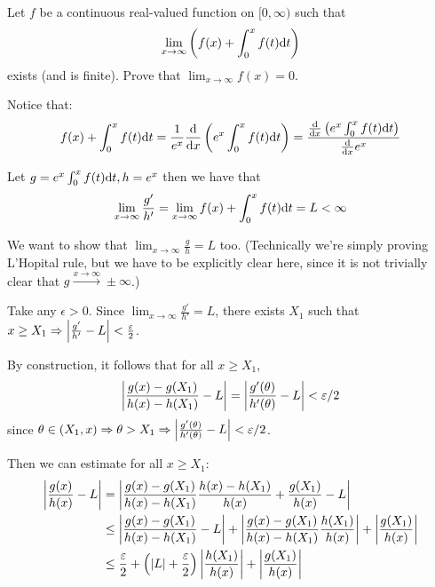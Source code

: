 \documentclass[a4paper, 12pt]{article}
\begin{document}
\begin{problem} 
Let $f$ be a continuous real-valued function on $[0, \infty)$ such that \begin{equation*}
\lim_{x \to \infty} \left(f(x) + \int_{0}^{x} f(t) \dt \right)
\end{equation*}
exists (and is finite). Prove that $\lim_{x \to \infty} f(x) = 0$.
\end{problem}
\begin{solution}
    Notice that:
    \begin{equation*}
    f(x) + \int_{0}^{x} f(t) \dt = \frac{1}{e^x} \ddx  \left(e^x \int_{0}^{x} f(t) \dt \right) = \frac{\ddx  \left(e^x \int_{0}^{x} f(t) \dt \right)}{\ddx e^x}
   \end{equation*}

   Let $g = e^x \int_{0}^{x} f(t) \dt, h = e^x$ then we have that \begin{equation*}
   \lim_{x \to \infty} \frac{g'}{h'} = \lim_{x \to \infty}  f(x) + \int_{0}^{x} f(t) \dt = L < \infty
   \end{equation*}

   We want to show that $\lim_{x \to \infty} \frac{g}{h} = L$ too. (Technically we're simply proving L'Hopital rule, but we have to be explicitly clear here, since it is not trivially clear that $g \xrightarrow{x \to \infty} \pm \infty$.)

   Take any $\epsilon > 0$. Since $\lim_{x \to \infty} \frac{g'}{h'} = L$, there exists $X_1$ such that $x \geq X_1 \implies \abs*{\frac{g'}{h'} - L} < \frac{\epsilon}{2}$.


   By construction, it follows that for all $x \geq X_1$, \begin{equation*}
   \abs*{\frac{g(x) - g(X_1)}{h(x) - h(X_1)} - L} = \abs*{\frac{g'(\theta)}{h'(\theta)} - L} < \epsilon/2
   \end{equation*}
   since $\theta \in (X_1, x) \implies \theta > X_1 \implies\abs*{\frac{g'(\theta)}{h'(\theta)} - L} < \epsilon/2$.
   
   Then we can estimate for all $x \geq X_1$:
   \begin{align*}
    \abs*{\frac{g(x)}{h(x)} - L} &= \abs*{\frac{g(x) - g(X_1)}{h(x) - h(X_1)} \frac{h(x) - h(X_1)}{h(x)} + \frac{g(X_1)}{h(x)} - L} \\
    &\leq \abs*{\frac{g(x) - g(X_1)}{h(x) - h(X_1)} - L} + \abs*{\frac{g(x) - g(X_1)}{h(x) - h(X_1)}\frac{h(X_1)}{h(x)}} + \abs*{\frac{g(X_1)}{h(x)}} \\
    &\leq \frac{\epsilon}{2} + \left(\abs{L} + \frac{\epsilon}{2}\right) \abs*{\frac{h(X_1)}{h(x)}} + \abs*{\frac{g(X_1)}{h(x)}}
   \end{align*}


\end{solution}
\end{document}

